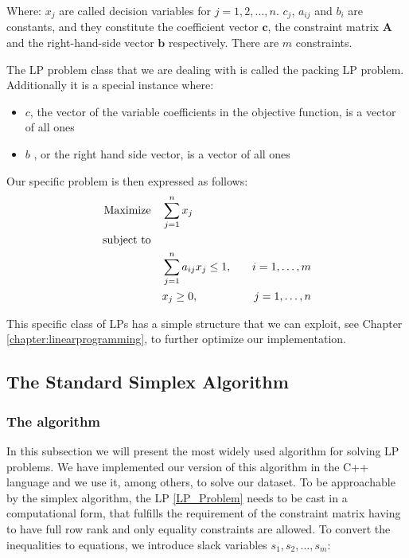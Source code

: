   Where: \(x_j\) are called decision variables for \(j = 1, 2, \ldots, n\).
  \(c_j\), \(a_{ij}\) and \(b_i\) are constants, and they constitute the coefficient vector 
  $\mathbf{c}$, the 
  constraint matrix $\mathbf{A}$ and the right-hand-side vector $\mathbf{b}$ respectively. 
  There are \(m\) constraints.
  
  The LP problem class that we are dealing with is called the packing LP problem. Additionally
  it is a special instance where:
  \begin{itemize}
      \item \( c \), the vector of the variable coefficients in the objective function,
      is a vector of all ones
      \item \( b \) , or the right hand side vector,  is a vector of all ones
  \end{itemize}
  Our specific problem is then expressed as follows:
  \begin{align}
      \text{Maximize} \quad & \sum_{j=1}^{n} x_j \notag \\
      \text{subject to} \quad & \notag \\
      & \sum_{j=1}^{n} a_{ij} x_j \leq 1, \quad & i = 1, \ldots, m \notag \\
      & x_j \geq 0, \quad & j = 1, \ldots, n \label{LP_Problem}
  \end{align}
  
  This specific class of LPs has a simple structure that we can exploit, see 
  Chapter \ref*{chapter:linearprogramming},
  to further optimize our implementation.

  \subsection{The Standard Simplex Algorithm}
  \subsubsection{The algorithm}
  
  In this subsection we will present the most widely used algorithm for solving
  LP problems. We have implemented our version  of this algorithm in the C++ language 
  and we use it, among others, to solve our dataset.
  To be approachable by the simplex algorithm, the LP \ref*{LP_Problem} needs to be cast in a 
  computational form, that fulfills the requirement of the constraint matrix having to have
  full row rank and only equality  constraints are allowed. 
  To convert the inequalities to equations, we introduce slack variables \(s_1, s_2, \dots, s_m\):

